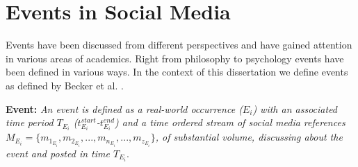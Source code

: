 





%
%

\section{Events in Social Media}



Events have been discussed from different perspectives and have gained attention in various areas of academics. Right from philosophy \cite{zalta2003stanford} to psychology \cite{zacks2001event} events have been defined in various ways. In the context of this dissertation we define events as defined by Becker et al. \cite{becker2011beyond}.

 


\textbf{Event:} \textit{An event is defined as a real-world occurrence ($ E_{i}$) with an associated time period $T_{E_{i}}$ ($t^{start}_{E_{i}}$-$t^{end}_{E_{i}}$) and a time ordered stream of social media references $M_{E_{i}} = {\{m_{1_{E_{i}}},m_{2_{E_{i}}}, ... ,m_{n_{E_{i}}}, ... ,m_{z_{E_{i}}}\}}$, of substantial volume, discussing about the event and posted in time $T_{E_{i}}$}.

